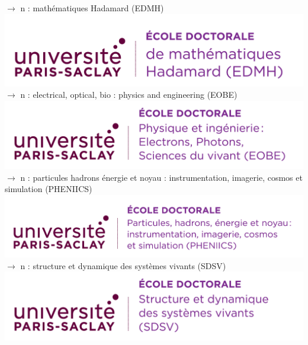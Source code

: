 \documentclass[french,12pt,a4paper]{book}
\begin{document}
\noindent \textbf{\color{Prune}$\rightarrow$} n : mathématiques Hadamard (EDMH)\\
\includegraphics[scale=.7]{logo_usp_EDMH}\\

\noindent \textbf{\color{Prune}$\rightarrow$} n : electrical, optical, bio : physics and engineering  (EOBE)\\
\includegraphics[scale=0.15]{EOBE}\\

\noindent \textbf{\color{Prune}$\rightarrow$} n : particules hadrons énergie et noyau : instrumentation, imagerie, cosmos et simulation (PHENIICS)\\
\includegraphics[scale=.7]{logo_usp_PHENIICS}\\

\noindent \textbf{\color{Prune}$\rightarrow$} n : structure et dynamique des systèmes vivants (SDSV)\\
\includegraphics[scale=.7]{logo_usp_SDSV}\\
\end{document}
